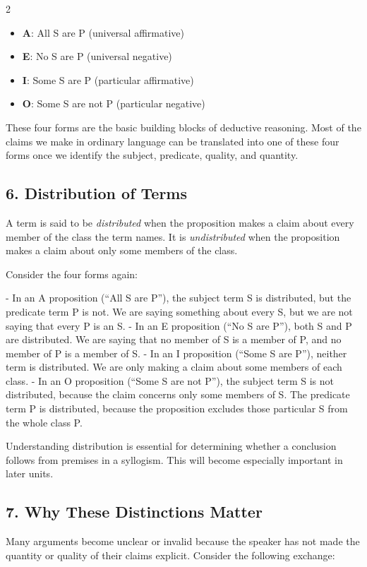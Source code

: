 \documentclass[12pt]{article}
\begin{document}
\begin{multicols}{2}
\begin{itemize}
\item \textbf{A}: All S are P (universal affirmative)
\item \textbf{E}: No S are P (universal negative)
\item \textbf{I}: Some S are P (particular affirmative)
\item \textbf{O}: Some S are not P (particular negative)
\end{itemize}

These four forms are the basic building blocks of deductive reasoning. Most of the claims we make in ordinary language can be translated into one of these four forms once we identify the subject, predicate, quality, and quantity.

\subsection*{6. Distribution of Terms}
A term is said to be \textit{distributed} when the proposition makes a claim about every member of the class the term names. It is \textit{undistributed} when the proposition makes a claim about only some members of the class.

Consider the four forms again:

- In an A proposition (“All S are P”), the subject term S is distributed, but the predicate term P is not. We are saying something about every S, but we are not saying that every P is an S.
- In an E proposition (“No S are P”), both S and P are distributed. We are saying that no member of S is a member of P, and no member of P is a member of S.
- In an I proposition (“Some S are P”), neither term is distributed. We are only making a claim about some members of each class.
- In an O proposition (“Some S are not P”), the subject term S is not distributed, because the claim concerns only some members of S. The predicate term P is distributed, because the proposition excludes those particular S from the whole class P.

Understanding distribution is essential for determining whether a conclusion follows from premises in a syllogism. This will become especially important in later units.

\subsection*{7. Why These Distinctions Matter}
Many arguments become unclear or invalid because the speaker has not made the quantity or quality of their claims explicit. Consider the following exchange:


\end{multicols}
\end{document}
